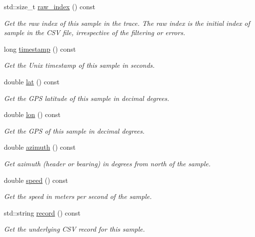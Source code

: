 \begin{DoxyCompactItemize}
std\+::size\+\_\+t \hyperlink{classgeo__data_1_1Sample_ac7ed68fe4f3e48e77a43ba52be3838e9}{raw\+\_\+index} () const 
\begin{DoxyCompactList}\small\item\em Get the raw index of this sample in the trace. The raw index is the initial index of sample in the C\+SV file, irrespective of the filtering or errors. \end{DoxyCompactList}\item 
long \hyperlink{classgeo__data_1_1Sample_a7c6cd5157117296b306f8e5726737090}{timestamp} () const 
\begin{DoxyCompactList}\small\item\em Get the Unix timestamp of this sample in seconds. \end{DoxyCompactList}\item 
double \hyperlink{classgeo__data_1_1Sample_a89ad23a22a5043e61e08129783333e4c}{lat} () const 
\begin{DoxyCompactList}\small\item\em Get the G\+PS latitude of this sample in decimal degrees. \end{DoxyCompactList}\item 
double \hyperlink{classgeo__data_1_1Sample_a0f3322502b9f32fbc51462e4b6270381}{lon} () const 
\begin{DoxyCompactList}\small\item\em Get the G\+PS of this sample in decimal degrees. \end{DoxyCompactList}\item 
double \hyperlink{classgeo__data_1_1Sample_a9be314cd78a47730551e6169748edc96}{azimuth} () const 
\begin{DoxyCompactList}\small\item\em Get azimuth (header or bearing) in degrees from north of the sample. \end{DoxyCompactList}\item 
double \hyperlink{classgeo__data_1_1Sample_a77437a286640779148c3f4905b90a16c}{speed} () const 
\begin{DoxyCompactList}\small\item\em Get the speed in meters per second of the sample. \end{DoxyCompactList}\item 
std\+::string \hyperlink{classgeo__data_1_1Sample_ac7ebb4bddcc448ab65843f29f7e3d2a5}{record} () const 
\begin{DoxyCompactList}\small\item\em Get the underlying C\+SV record for this sample. \end{DoxyCompactList}\item 

\end{DoxyCompactItemize}
